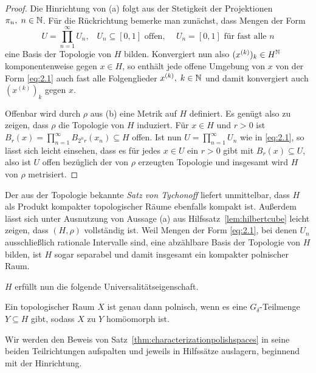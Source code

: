 \documentclass[../main/main.tex]{subfiles}
\begin{document}
	\begin{proof}
		Die Hinrichtung von (a) folgt aus der Stetigkeit der Projektionen 
		$\pi_n, \; n \in \mathbb{N}$. Für die Rückrichtung bemerke man zunächst, dass Mengen der Form 
		\[U = \prod_{n=1}^{\infty} U_n\text{,} \quad U_n \subseteq [0, 1] \text{ offen, }
		\quad U_n = [0, 1] \text{ für fast alle } n \label{eq:2.1} \tag{2.1}\]
		eine Basis der Topologie von $H$ bilden. 
		Konvergiert nun also $(x^{(k)})_k \in H^{\mathbb{N}}$ komponentenweise gegen $x \in H$, 
		so enthält jede offene Umgebung von $x$ von der Form \eqref{eq:2.1} auch fast 
		alle Folgenglieder $x^{(k)}, \; k \in \mathbb{N}$ und damit konvergiert 
		auch $(x^{(k)})_k$ gegen $x$.
		
		Offenbar wird durch $\rho$ aus (b) eine Metrik auf $H$ definiert. 
		Es genügt also zu zeigen, dass $\rho$ die Topologie von $H$ induziert. 
		Für $x \in H$ und $r > 0$ ist 
		$B_r(x) = \prod_{n=1}^{\infty} B_{2^n r}(x_n) \subseteq H$ 
		offen. Ist nun $U = \prod_{n=1}^{\infty} U_n$ wie in \eqref{eq:2.1}, 
		so lässt sich leicht einsehen, dass es für jedes $x \in U$ ein $r > 0$ 
		gibt mit $B_r(x) \subseteq U$, also ist $U$ offen bezüglich der von $\rho$ 
		erzeugten Topologie und insgesamt wird $H$ von $\rho$ metrisiert.
	\end{proof}
	
	Der aus der Topologie bekannte \emph{Satz von Tychonoff} liefert 
	unmittelbar, dass $H$ als Produkt kompakter topologischer Räume 
	ebenfalls kompakt ist.
	Außerdem lässt sich unter Ausnutzung von Aussage (a) aus 
	Hilfssatz~\ref{lem:hilbertcube} leicht zeigen, dass $(H, \rho)$ 
	vollständig ist. Weil Mengen der Form \eqref{eq:2.1}, bei denen 
	$U_n$ ausschließlich rationale Intervalle sind, eine abzählbare 
	Basis der Topologie von $H$ bilden, ist $H$ sogar separabel und 
	damit insgesamt ein kompakter polnischer Raum.
	
	$H$ erfüllt nun die folgende Universalitätseigenschaft.
	
	\begin{Satz}
		\label{thm:characterizationpolishspaces}
		Ein topologischer Raum $X$ ist genau dann polnisch, 
		wenn es eine $G_\delta$-Teilmenge $Y \subseteq H$ gibt, sodass $X$ 
		zu $Y$ homöomorph ist. 
	\end{Satz}

	Wir werden den Beweis von Satz~\ref{thm:characterizationpolishspaces} in seine beiden Teilrichtungen
	aufspalten und jeweils in Hilfssätze auslagern, beginnend mit der Hinrichtung.
	
\end{document}
